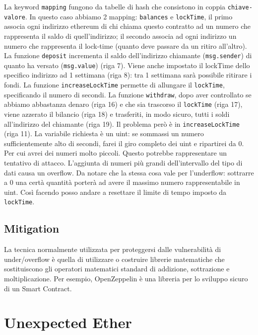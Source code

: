 La keyword \verb|mapping| fungono da tabelle di hash che consistono in coppia
\verb|chiave-valore|. In questo caso abbiamo 2 mapping: \verb|balances| e \verb|lockTime|,
il primo associa ogni indirizzo ethereum di chi chiama questo contratto ad un numero
che rappresenta il saldo di quell'indirizzo; il secondo associa ad ogni indirizzo
un numero che rappresenta il lock-time (quanto deve passare da un ritiro all'altro).
La funzione \verb|deposit| incrementa il saldo dell'indirizzo chiamante (\verb|msg.sender|)
di quanto ha versato (\verb|msg.value|) (riga 7). Viene anche impostato il lockTime
dello specifico indirizzo ad 1 settimana (riga 8): tra 1 settimana sarà possibile ritirare i fondi.
La funzione \verb|increaseLockTime| permette di allungare il \verb|lockTime|, specificando
il numero di secondi.
La funzione \verb|withdraw|, dopo aver controllato se abbiamo abbastanza denaro
(riga 16) e che sia trascorso il \verb|lockTime| (riga 17), viene azzerato
il bilancio (riga 18)
e trasferiti, in modo sicuro, tutti i soldi all'indirizzo del chiamante (riga 19).
Il problema però è in \verb|increaseLockTime| (riga 11).
La variabile richiesta è un uint: se sommassi un
numero sufficientemente alto di secondi, farei il giro completo dei uint e
ripartirei da 0.
Per cui avrei dei numeri molto piccoli.
Questo potrebbe rappresentare un tentativo di attacco.
L'aggiunta di numeri più grandi dell'intervallo del tipo di dati causa un overflow.
Da notare che la stessa cosa vale per l'underflow: sottrarre a $0$ una certà
quantità porterà ad avere il massimo numero rappresentabile in uint.
Così facendo posso andare a resettare il limite di tempo imposto da \verb|lockTime|.

\subsection{Mitigation}

La tecnica normalmente utilizzata per proteggersi dalle vulnerabilità di
under/overflow è
quella di utilizzare o costruire librerie matematiche che sostituiscono gli
operatori matematici
standard di addizione, sottrazione e moltiplicazione.
Per esempio, OpenZeppelin è una
libreria per lo sviluppo sicuro di un Smart Contract.

\section{Unexpected Ether}

